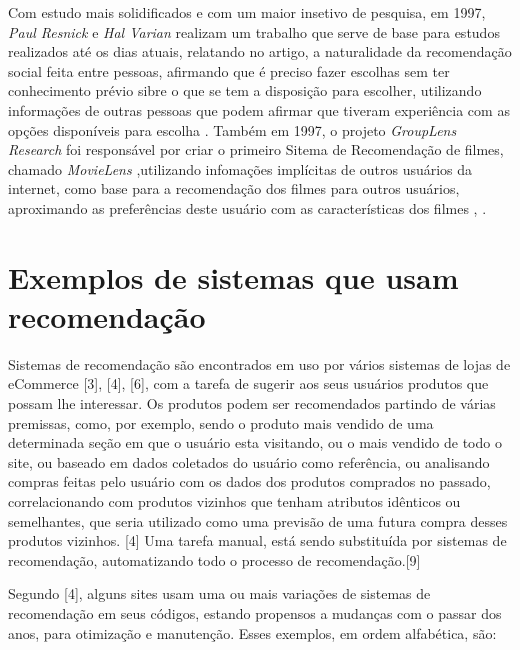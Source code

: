 \documentclass[12pt,
				openright,
				twoside,
				a4paper,
				apter=TITLE,
				section=TITLE,
				subsection=TITLE,
				chapter=TITLE,
				english,
				brazil]{abntex2}
\begin{document}
Com estudo mais solidificados e com um maior insetivo de pesquisa, em 1997, \textit{Paul Resnick} e \textit{Hal Varian} realizam um trabalho que serve de base para estudos realizados até os dias atuais, relatando no artigo, a naturalidade da recomendação social feita entre pessoas, afirmando que é preciso fazer escolhas sem ter conhecimento prévio sibre o que se tem a disposição para escolher, utilizando informações de outras pessoas que podem afirmar que tiveram experiência com as opções disponíveis para escolha \cite{resnick1997recommender}. Também em 1997, o projeto \textit{GroupLens Research} foi responsável por criar o primeiro Sitema de Recomendação de filmes, chamado \textit{MovieLens} ,utilizando infomações implícitas de outros usuários da internet, como base para a recomendação dos filmes para outros usuários, aproximando as preferências deste usuário com as características dos filmes \cite{miller2003movielens}, \cite{konstan1998recommender}.



\section{Exemplos de sistemas que usam recomendação}
Sistemas de recomendação são encontrados em uso por vários sistemas de lojas de eCommerce [3], [4], [6], com a tarefa de sugerir aos seus usuários produtos que possam lhe interessar. Os produtos podem ser recomendados partindo de várias premissas, como, por exemplo, sendo o produto mais vendido de uma determinada seção em que o usuário esta visitando, ou o
mais vendido de todo o site, ou baseado em dados coletados do usuário como referência, ou analisando compras feitas pelo usuário com os dados dos produtos comprados no passado, correlacionando com produtos vizinhos que tenham atributos idênticos ou semelhantes, que seria utilizado como uma previsão de uma futura compra desses produtos vizinhos. [4] Uma
tarefa manual, está sendo substituída por sistemas de recomendação, automatizando todo o processo de recomendação.[9] 

Segundo [4], alguns sites usam uma ou mais variações de sistemas de recomendação em seus códigos, estando propensos a mudanças com o passar dos anos, para otimização e manutenção. Esses exemplos, em ordem alfabética, são: 
\end{document}
